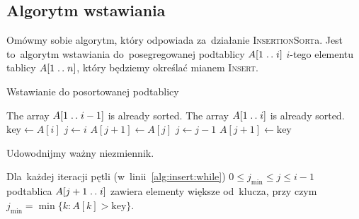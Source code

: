 \subsection{Algorytm wstawiania}
Omówmy sobie algorytm, który odpowiada za~działanie 
\textsc{InsertionSort}a. Jest to~algorytm wstawiania 
do~posegregowanej podtablicy \( A[1 \mathrel{{.}\,{.}}\nobreak i] \) \(i\)-tego elementu
tablicy \(A[1 \mathrel{{.}\,{.}}\nobreak n]\), który będziemy określać
mianem \textsc{Insert}. 
\begin{algorithm}%
    \label{alg:insert}
    \caption{Wstawianie do posortowanej podtablicy}
    \begin{algorithmic}[1]
        \Require The array \( A[1 \mathrel{{.}\,{.}}\nobreak i - 1] \) is already sorted.
        \Ensure The array \( A[1 \mathrel{{.}\,{.}}\nobreak i] \) is already sorted.
            \State \( \text{key} \gets A[i]\)
            \State \( j \gets i \)
            \label{alg:insert:while}
                \State \( A[j + 1] \gets A[j] \)
                \State \( j \gets j - 1 \)
            \EndWhile
            \State \( A[j + 1] \gets \text{key} \)
        \EndProcedure%
    \end{algorithmic}
\end{algorithm}
Udowodnijmy ważny niezmiennik.
\begin{invariant}\label{inv:insert}
    Dla~każdej iteracji pętli (w~linii~\ref{alg:insert:while})
    \( 0 \le j_{\text{min}} \le j \le i - 1 \) podtablica \( A[ j + 1 \mathrel{{.}\,{.}}\nobreak i] \)
    zawiera elementy większe od~klucza,
    przy czym \( j_{\text{min}} = \min \{ k : A[k] > \text{key} \} \).
\end{invariant}

